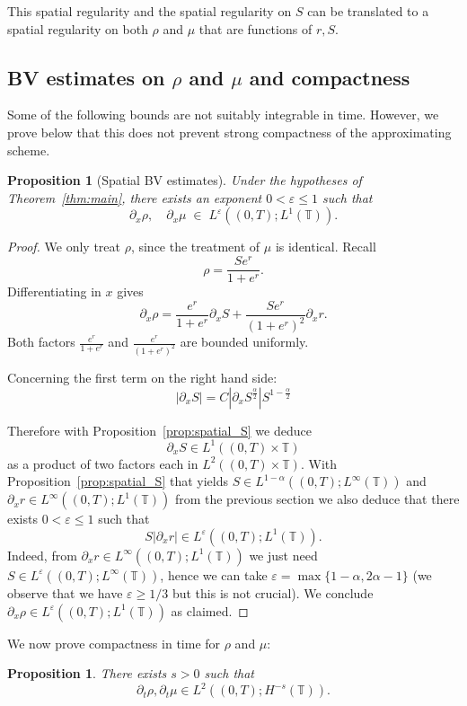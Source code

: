 \documentclass[a4paper,twosided, 11pt]{article}
\newcommand {\T}  { {\mathbb{T}} }
\theoremstyle{plain}
\newtheorem{proposition}[thm]{Proposition}
\theoremstyle{remark}
\numberwithin{equation}{section}
\begin{document}
This spatial regularity and the spatial regularity on $S$ can be translated to a spatial regularity on both $\rho$ and $\mu$ that are functions of $r,S$.  

\subsection{BV estimates on $\rho$ and $\mu$ and compactness}

Some of the following bounds are not suitably integrable in time. However, we prove below that this does not prevent strong compactness of the approximating scheme. 

\begin{proposition}[Spatial BV estimates]
\label{prop:BV_estim_rho_mu}
Under the hypotheses of Theorem~\ref{thm:main}, there exists an exponent $0<\varepsilon\le1$ such that
$$
\partial_x\rho,\quad \partial_x\mu \;\in\;L^\varepsilon((0,T);L^1(\T)).
$$
\end{proposition}


\begin{proof}
We only treat $\rho$, since the treatment of $\mu$ is identical.  Recall
$$
\rho
=\frac{Se^{r}}{1+e^{r}}.
$$
Differentiating in $x$ gives
$$
\partial_x\rho
=\frac{e^r}{1+e^r}\partial_xS
+
\frac{Se^r}{(1+e^r)^2}\partial_xr.
$$
Both factors $\frac{e^r}{1+e^r}$ and $\frac{e^r}{(1+e^r)^2}$ are bounded uniformly.


Concerning the first term on the right hand side: 
$$
|\partial_x S| =  C |\partial_x S^{\frac{\alpha}{2}} |S^{1-\frac{\alpha}{2}}
$$

Therefore with Proposition~\ref{prop:spatial_S} we deduce
$$
\partial_x S\in L^{1}((0,T)\times \T)
$$
as a product of two factors each in $L^{2}((0,T)\times \T)$.
With Proposition~\ref{prop:spatial_S} that yields $S\in L^{1-\alpha}((0,T); L^{\infty}(\T))$ and $\partial_xr \in L^{\infty}((0,T); L^{1}(\T))$ from the previous section we also deduce that there exists $0<\varepsilon\le 1$ such that 
$$
S|\partial_xr|\in L^{\varepsilon}((0,T); L^{1}(\T)).
$$
Indeed, from $\partial_x r\in L^\infty((0,T); L^{1}(\T))$ we just need $S\in  L^\varepsilon((0,T); L^{\infty}(\T))$, hence we can take $\varepsilon=\max\{1-\alpha,2\alpha-1\}$ (we observe that we have $\varepsilon\geq 1/3$ but this is not crucial).
We conclude $\partial_x \rho \in L^{\varepsilon}((0,T); L^{1}(\T))$ as claimed.
\end{proof}

We now prove compactness in time for $\rho$ and $\mu$:
\begin{proposition}
There exists $s>0$ such that
\begin{equation*}
    \partial_t\rho, \partial_t \mu \in L^{2}((0,T); H^{-s}(\T)). 
\end{equation*}
\end{proposition}
\end{document}
